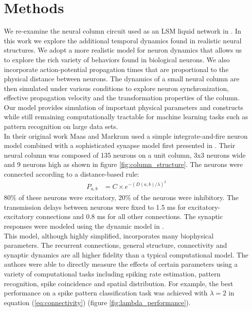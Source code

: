 \documentclass[a4paper,11pt]{article}
\begin{document}
\section{Methods}
We re-examine the neural column circuit used as an LSM liquid network in \cite{maas2002}.
In this work we explore the additional temporal dynamics found in realistic neural structures.
We adopt a more realistic model for neuron dynamics that allows us to explore the rich variety of behaviors found in biological neurons.
We also incorporate action-potential propagation times that are proportional to the physical distance between neurons.
The dynamics of a small neural column are then simulated under various conditions to explore neuron synchronization, effective propagation velocity and the transformation properties of the column.
Our model provides simulation of important physical parameters and constructs while still remaining computationally tractable for machine learning tasks such as pattern recognition on large data sets.
\\
In their original work Maas and Markram used a simple integrate-and-fire neuron model combined with a sophisticated synapse model first presented in \cite{markram1998}.
Their neural column was composed of 135 neurons on a unit column, 3x3 neurons wide and 9 neurons high as shown in figure \ref{fig:column_structure}.
The neurons were connected according to a distance-based rule:
\begin{align}\label{eq:connectivity}
 P_{a,b} &= C \times e^{-(D(a,b)/\lambda)^2}
\end{align}
80\% of these neurons were excitatory, 20\% of the neurons were inhibitory. 
The transmission delays between neurons were fixed to 1.5 ms for excitatory-excitatory connections and 0.8 ms for all other connections.
The synaptic responses were modeled using the dynamic model in \cite{markram1998}. \\
This model, although highly simplified, incorporates many biophysical parameters.
The recurrent connections, general structure, connectivity and synaptic dynamics are all higher fidelity than a typical computational model.
The authors were able to directly measure the effects of certain parameters using a variety of computational tasks including spiking rate estimation, pattern recognition, spike coincidence and spatial distribution. 
For example, the best performance on a spike pattern classification task was achieved with $\lambda=2$ in equation (\ref{eq:connectivity}) (figure \ref{fig:lambda_performance}).
\\
\end{document}
